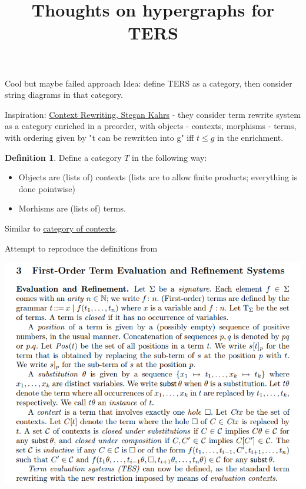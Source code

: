 \documentclass{article}
\title{Thoughts on hypergraphs for TERS}
\theoremstyle{plain}
\theoremstyle{definition}
\newtheorem{mydefinition}[mytheorem]{Definition}
\begin{document}
\maketitle



\begin{section}{Cool but maybe failed approach}
Idea: define TERS as a category, then consider string diagrams in that category.

Inspiration: \href{https://link.springer.com/content/pdf/10.1007/3-540-56393-8_2.pdf}{Context Rewriting, Stegan Kahrs} - they consider term rewrite system as a category enriched in a preorder, with objects - contexts, morphisms - terms, with ordering given by "t can be rewritten into g" iff $t \le g$ in the enrichment.


\begin{mydefinition}
    Define a category $T$ in the following way:
\begin{itemize}
    \item Objects are (lists of) contexts (lists are to allow finite products; everything is done pointwise)
    \item Morhisms are (lists of) terms.
\end{itemize}
Similar to \href{https://ncatlab.org/nlab/show/syntactic+category}{category of contexts}.
\end{mydefinition}

Attempt to reproduce the definitions from \cite{DBLP:conf/flops/MuroyaH24}

\includegraphics[scale=0.5]{images/ref.png}


\end{section}
\end{document}
